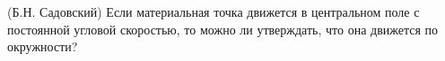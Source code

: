 (Б.Н. Садовский)
Если материальная точка движется в центральном поле с постоянной угловой
скоростью, то можно ли утверждать, что она движется по окружности?
